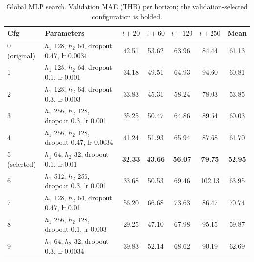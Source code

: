 \documentclass[11pt]{article}
\begin{document}
\begin{table}[htbp]\centering
\caption{Global MLP search. Validation MAE (THB) per horizon; the validation-selected configuration is bolded.}
\label{tab:mlp}
\scriptsize
\setlength{\tabcolsep}{3.5pt}
\begin{tabular}{llccccc}
\toprule
Cfg & Parameters & $t{+}20$ & $t{+}60$ & $t{+}120$ & $t{+}250$ & Mean \\
\midrule
0 (original) & $h_1$ 128, $h_2$ 64, dropout 0.47, lr 0.0034 & 42.51 & 53.62 & 63.96 & 84.44 & 61.13 \\
1 & $h_1$ 128, $h_2$ 64, dropout 0.1, lr 0.001 & 34.18 & 49.51 & 64.93 & 94.60 & 60.81 \\
2 & $h_1$ 128, $h_2$ 64, dropout 0.3, lr 0.003 & 33.83 & 45.31 & 58.24 & 78.03 & 53.85 \\
3 & $h_1$ 256, $h_2$ 128, dropout 0.3, lr 0.001 & 35.25 & 50.47 & 64.86 & 89.54 & 60.03 \\
4 & $h_1$ 256, $h_2$ 128, dropout 0.47, lr 0.0034 & 41.24 & 51.93 & 65.94 & 87.68 & 61.70 \\
5 (selected) & $h_1$ 64, $h_2$ 32, dropout 0.1, lr 0.01 & \textbf{32.33} & \textbf{43.66} & \textbf{56.07} & \textbf{79.75} & \textbf{52.95} \\
6 & $h_1$ 512, $h_2$ 256, dropout 0.3, lr 0.001 & 33.68 & 50.53 & 69.46 & 102.13 & 63.95 \\
7 & $h_1$ 128, $h_2$ 64, dropout 0.47, lr 0.01 & 56.20 & 66.68 & 73.63 & 86.47 & 70.74 \\
8 & $h_1$ 256, $h_2$ 128, dropout 0.1, lr 0.003 & 29.25 & 47.10 & 67.98 & 95.15 & 59.87 \\
9 & $h_1$ 64, $h_2$ 32, dropout 0.3, lr 0.0034 & 39.83 & 52.14 & 68.62 & 90.19 & 62.69 \\
\bottomrule
\end{tabular}
\end{table}
\end{document}
